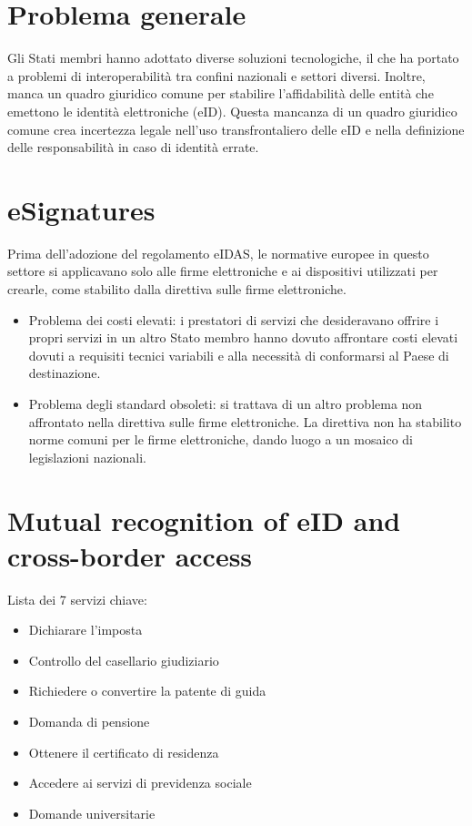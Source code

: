 \section{Problema generale}
Gli Stati membri hanno adottato diverse soluzioni tecnologiche, il che ha portato a problemi di interoperabilità tra confini nazionali e settori diversi. Inoltre, manca un quadro giuridico comune per stabilire l'affidabilità delle entità che emettono le identità elettroniche (eID). Questa mancanza di un quadro giuridico comune crea incertezza legale nell'uso transfrontaliero delle eID e nella definizione delle responsabilità in caso di identità errate.

\section{eSignatures}
Prima dell'adozione del regolamento eIDAS, le normative europee in questo settore si applicavano solo alle firme elettroniche e ai dispositivi utilizzati per crearle, come stabilito dalla direttiva sulle firme elettroniche.
\begin{itemize}
    \item Problema dei costi elevati: i prestatori di servizi che desideravano offrire i propri servizi in un altro Stato membro hanno dovuto affrontare costi elevati dovuti a requisiti tecnici variabili e alla necessità di conformarsi al Paese di destinazione.
    \item Problema degli standard obsoleti: si trattava di un altro problema non affrontato nella direttiva sulle firme elettroniche. La direttiva non ha stabilito norme comuni per le firme elettroniche, dando luogo a un mosaico di legislazioni nazionali.
    
\end{itemize}

\section{Mutual recognition of eID and cross-border access}
Lista dei 7 servizi chiave:

\begin{itemize}
    \item Dichiarare l'imposta
    \item Controllo del casellario giudiziario
    \item Richiedere o convertire la patente di guida
    \item Domanda di pensione
    \item Ottenere il certificato di residenza
    \item Accedere ai servizi di previdenza sociale
    \item Domande universitarie
\end{itemize}

